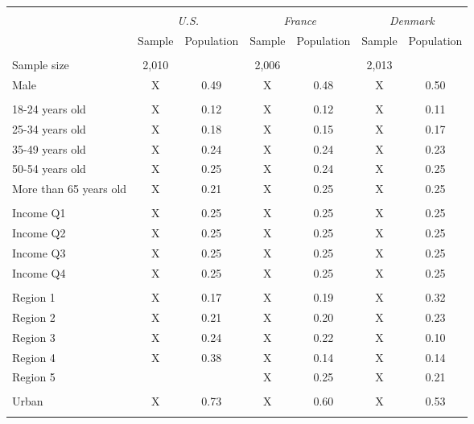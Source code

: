 \begin{tabular}{lcccccc}
\toprule
\hline \\[-1.8ex]
\multicolumn{1}{c}{\em{ }} & \multicolumn{2}{c}{\em{U.S.}} & \multicolumn{2}{c}{\em{France}} & \multicolumn{2}{c}{\em{Denmark}}\\
\cmidrule(l{3pt}r{3pt}){2-3} \cmidrule(l{3pt}r{3pt}){4-5} \cmidrule(l{3pt}r{3pt}){6-7}
\noalign{\smallskip}  & Sample & Population & Sample & Population & Sample & Population \\
\hline \\[-1.8ex] 
Sample size & 2,010 & & 2,006 &  & 2,013 & \\
\noalign{\smallskip}\hline \noalign{\smallskip}Male & X & 0.49 & X & 0.48 & X & 0.50\\ 
\\
18-24 years old & X & 0.12 & X & 0.12 & X & 0.11\\
25-34 years old & X & 0.18 & X & 0.15 & X & 0.17\\
35-49 years old & X & 0.24 & X & 0.24 & X & 0.23\\
50-54 years old & X & 0.25 & X & 0.24 & X & 0.25\\
More than 65 years old & X & 0.21 & X & 0.25 & X & 0.25\\ 
\\
Income Q1 & X & 0.25 & X & 0.25 & X & 0.25\\
Income Q2 & X & 0.25 & X & 0.25 & X & 0.25\\
Income Q3 & X & 0.25 & X & 0.25 & X & 0.25\\
Income Q4 & X & 0.25 & X & 0.25 & X & 0.25\\
\\
Region 1 & X & 0.17 & X & 0.19 & X & 0.32\\
Region 2 & X & 0.21 & X & 0.20 & X & 0.23\\
Region 3 & X & 0.24 & X & 0.22 & X & 0.10\\
Region 4 & X & 0.38 & X & 0.14 & X & 0.14\\
Region 5 &  &  & X & 0.25 & X & 0.21\\
\\
Urban & X & 0.73 & X & 0.60 & X & 0.53\\
\\
\bottomrule
\end{tabular}